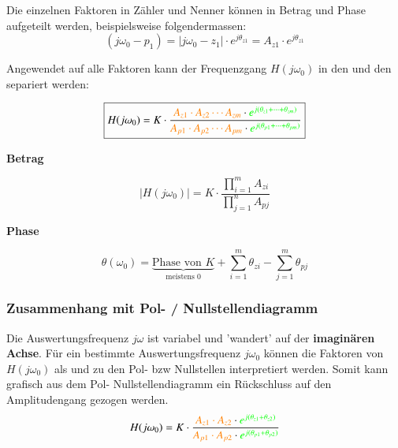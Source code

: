 Die einzelnen Faktoren in Zähler und Nenner können in Betrag und Phase aufgeteilt werden, beispielsweise folgendermassen:
$$ (j \omega_0 - p_1) = |j \omega_0 - z_1| \cdot e^{j \theta_{z1}} = A_{z1} \cdot e^{j \theta_{z1}} $$



Angewendet auf alle Faktoren kann der Frequenzgang $H(j \omega_0)$ in den  und den
 separiert werden:

$$ \boxed{ H(j \omega_0) = K \cdot \frac{{\color{orange}A_{z1} \cdot A_{z2} \cdots A_{zm}} \cdot {\color{green}e^{j(\theta_{z1} + \cdots + \theta_{zm})}}}
                                        {{\color{orange}A_{p1} \cdot A_{p2} \cdots A_{pm}} \cdot {\color{green}e^{j(\theta_{p1} + \cdots + \theta_{pm})}}} } $$

\vspace{0.2cm}
\begin{minipage}[t]{0.48\columnwidth}
    \begin{center}
        \textbf{Betrag}
    \end{center}
    \vspace{-0.2cm}
    $$ \boxed{ | H(j \omega_0) | = K \cdot \frac{\prod_{i=1}^{m} A_{zi}}{\prod_{j=1}^{n} A_{pj}} } $$
\end{minipage}
\hfill
\begin{minipage}[t]{0.48\columnwidth}
    \begin{center}
        \textbf{Phase}
    \end{center}
    \vspace{-0.2cm}
    $$ \boxed{ \theta(\omega_0) = \underbrace{\text{Phase von } K}_{\text{meistens } 0} + \sum_{i=1}^{m} \theta_{zi} - \sum_{j=1}^{m} \theta_{pj} } $$
\end{minipage}


\subsubsection{Zusammenhang mit Pol- / Nullstellendiagramm}

\begin{minipage}[c]{0.5\columnwidth}
    
\end{minipage}
\hfill
\begin{minipage}[c]{0.48\columnwidth}
    Die Auswertungsfrequenz $j \omega$ ist variabel und 'wandert' auf der \textbf{imaginären Achse}.
    Für ein bestimmte Auswertungsfrequenz $j \omega_0$ können die Faktoren von $H(j \omega_0)$ als 
    und  zu den Pol- bzw Nullstellen interpretiert werden.
    Somit kann grafisch aus dem Pol- Nullstellendiagramm ein Rückschluss auf den Amplitudengang gezogen werden.
    $$ H(j \omega_0) = K \cdot \frac{{\color{orange}A_{z1} \cdot A_{z2}} \cdot {\color{green}e^{j(\theta_{z1} + \theta_{z2})}}}
    {{\color{orange}A_{p1} \cdot A_{p2}} \cdot {\color{green}e^{j(\theta_{p1} + \theta_{p2})}}}  $$
\end{minipage}


